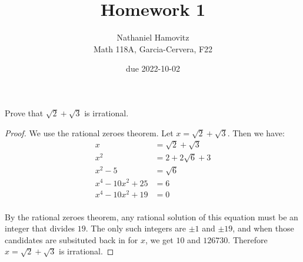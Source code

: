 \documentclass{article}
\newenvironment{problem}[2][Problem]{\begin{trivlist}
\item[\hskip \labelsep {\bfseries #1}\hskip \labelsep {\bfseries #2.}]}{\end{trivlist}}
\begin{document}


\title{Homework 1} %
\author{Nathaniel Hamovitz\\Math 118A, Garcia-Cervera, F22}
\date{due 2022-10-02}

\maketitle

\begin{problem}{1} %
    Prove that $\sqrt{2} + \sqrt{3}$ is irrational.
\end{problem}
\begin{proof}
    We use the rational zeroes theorem. Let $x = \sqrt{2} + \sqrt{3}$. Then we have:
    \begin{align*}
        x &= \sqrt{2} + \sqrt{3} \\
        x^2 &= 2 + 2\sqrt{6} + 3 \\
        x^2 - 5 &= \sqrt{6} \\
        x^4 - 10x^2 + 25 &= 6 \\
        x^4 - 10x^2 + 19 &= 0 \\
    \end{align*}


    By the rational zeroes theorem, any rational solution of this equation must be an integer that divides $19$. The only such integers are $\pm 1$ and $\pm 19$, and when those candidates are subsituted back in for $x$, we get $10$ and $126730$. Therefore $x = \sqrt{2} + \sqrt{3}$ is irrational.
\end{proof}

\end{document}
